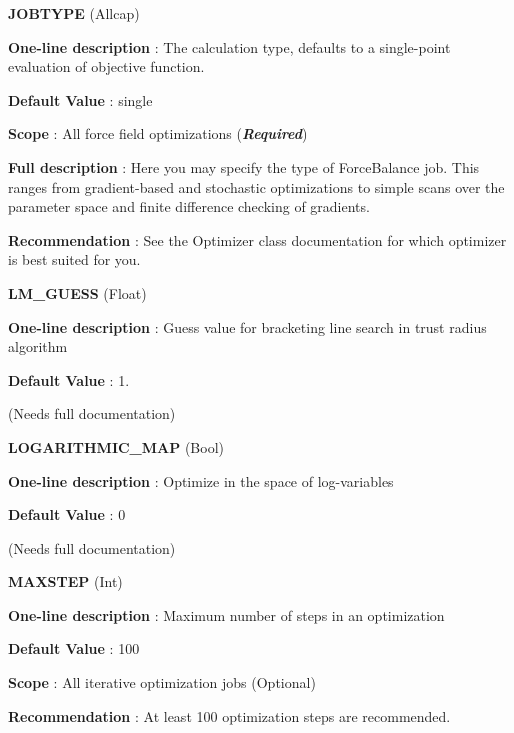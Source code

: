 \begin{DoxyItemize}
\item {\bfseries  \-J\-O\-B\-T\-Y\-P\-E } (\-Allcap) \par
{\bfseries  \-One-\/line description }\-: \-The calculation type, defaults to a single-\/point evaluation of objective function. \par
{\bfseries  \-Default \-Value }\-: single \par
{\bfseries  \-Scope }\-: \-All force field optimizations ({\bfseries {\itshape \-Required\/}}) \par
{\bfseries  \-Full description }\-: \-Here you may specify the type of \-Force\-Balance job. \-This ranges from gradient-\/based and stochastic optimizations to simple scans over the parameter space and finite difference checking of gradients. \par
{\bfseries  \-Recommendation }\-: \-See the \-Optimizer class documentation for which optimizer is best suited for you.\end{DoxyItemize}
\begin{DoxyItemize}
\item {\bfseries  \-L\-M\-\_\-\-G\-U\-E\-S\-S } (\-Float) \par
{\bfseries  \-One-\/line description }\-: \-Guess value for bracketing line search in trust radius algorithm \par
{\bfseries  \-Default \-Value }\-: 1. \par
(\-Needs full documentation)\end{DoxyItemize}
\begin{DoxyItemize}
\item {\bfseries  \-L\-O\-G\-A\-R\-I\-T\-H\-M\-I\-C\-\_\-\-M\-A\-P } (\-Bool) \par
{\bfseries  \-One-\/line description }\-: \-Optimize in the space of log-\/variables \par
{\bfseries  \-Default \-Value }\-: 0 \par
(\-Needs full documentation)\end{DoxyItemize}
\begin{DoxyItemize}
\item {\bfseries  \-M\-A\-X\-S\-T\-E\-P } (\-Int) \par
{\bfseries  \-One-\/line description }\-: \-Maximum number of steps in an optimization \par
{\bfseries  \-Default \-Value }\-: 100 \par
{\bfseries  \-Scope }\-: \-All iterative optimization jobs (\-Optional) \par
{\bfseries  \-Recommendation }\-: \-At least 100 optimization steps are recommended.\end{DoxyItemize}
